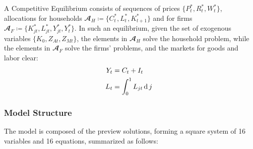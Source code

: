 \documentclass[
thesis.tex
]{subfiles}
\begin{document}
	A Competitive Equilibrium consists of sequences of prices $\{P_t^\ast, R_t^\ast, W_t^\ast\}$, allocations for households $\mathbfscr{A}_H \coloneq \{C_t^\ast, L_t^\ast, K_{t+1}^\ast\}$ and for firms $\mathbfscr{A}_F \coloneq \{K_{jt}^\ast, L_{jt}^\ast, Y_{jt}^\ast, Y_t^\ast\}$. In such an equilibrium, given the set of exogenous variables $\{K_0, Z_{At}, Z_{Mt}\}$, the elements in $\mathbfscr{A}_H$ solve the household problem, while the elements in $\mathbfscr{A}_F$ solve the firms' problems, and the markets for goods and labor clear:
	\begin{align}
		Y_t &= C_t + I_t \label{eq:market-clearing-condition} \\
		L_t &= \int_{0}^{1} L_{jt} \operatorname{d} j \label{eq:market-clearing-condition-2}
	\end{align}
	
	
	
	\subsubsection{Model Structure}
	
	The model is composed of the preview solutions, forming a square system of 16 variables and 16 equations, summarized as follows:
	
\end{document}
